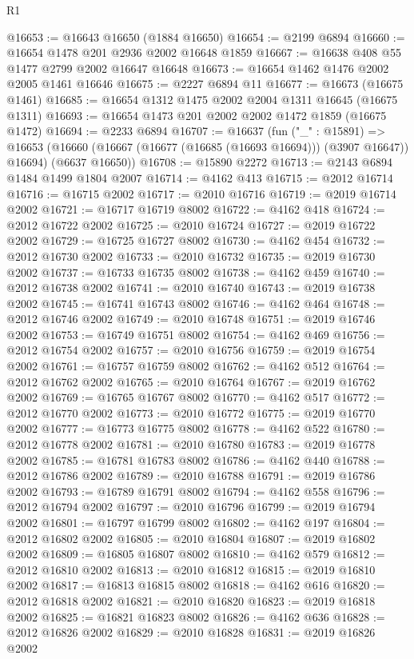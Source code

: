 \begin{lexlean}{R1}
\begin{coremodule}
@16653 := @16643 @16650 (@1884 @16650)
@16654 := @2199 @6894
@16660 := @16654 @1478 @201 @2936 @2002 @16648 @1859
@16667 := @16638 @408 @55 @1477 @2799 @2002 @16647 @16648
@16673 := @16654 @1462 @1476 @2002 @2005 @1461 @16646
@16675 := @2227 @6894 @11
@16677 := @16673 (@16675 @1461)
@16685 := @16654 @1312 @1475 @2002 @2004 @1311 @16645 (@16675 @1311)
@16693 := @16654 @1473 @201 @2002 @2002 @1472 @1859 (@16675 @1472)
@16694 := @2233 @6894
@16707 := @16637
    (fun ("_" : @15891) =>
    @16653 (@16660 (@16667 (@16677 (@16685 (@16693 @16694))) (@3907 @16647)) @16694) (@6637 @16650))
@16708 := @15890 @2272
@16713 := @2143 @6894 @1484 @1499 @1804 @2007
@16714 := @4162 @413
@16715 := @2012 @16714
@16716 := @16715 @2002
@16717 := @2010 @16716
@16719 := @2019 @16714 @2002
@16721 := @16717 @16719 @8002
@16722 := @4162 @418
@16724 := @2012 @16722 @2002
@16725 := @2010 @16724
@16727 := @2019 @16722 @2002
@16729 := @16725 @16727 @8002
@16730 := @4162 @454
@16732 := @2012 @16730 @2002
@16733 := @2010 @16732
@16735 := @2019 @16730 @2002
@16737 := @16733 @16735 @8002
@16738 := @4162 @459
@16740 := @2012 @16738 @2002
@16741 := @2010 @16740
@16743 := @2019 @16738 @2002
@16745 := @16741 @16743 @8002
@16746 := @4162 @464
@16748 := @2012 @16746 @2002
@16749 := @2010 @16748
@16751 := @2019 @16746 @2002
@16753 := @16749 @16751 @8002
@16754 := @4162 @469
@16756 := @2012 @16754 @2002
@16757 := @2010 @16756
@16759 := @2019 @16754 @2002
@16761 := @16757 @16759 @8002
@16762 := @4162 @512
@16764 := @2012 @16762 @2002
@16765 := @2010 @16764
@16767 := @2019 @16762 @2002
@16769 := @16765 @16767 @8002
@16770 := @4162 @517
@16772 := @2012 @16770 @2002
@16773 := @2010 @16772
@16775 := @2019 @16770 @2002
@16777 := @16773 @16775 @8002
@16778 := @4162 @522
@16780 := @2012 @16778 @2002
@16781 := @2010 @16780
@16783 := @2019 @16778 @2002
@16785 := @16781 @16783 @8002
@16786 := @4162 @440
@16788 := @2012 @16786 @2002
@16789 := @2010 @16788
@16791 := @2019 @16786 @2002
@16793 := @16789 @16791 @8002
@16794 := @4162 @558
@16796 := @2012 @16794 @2002
@16797 := @2010 @16796
@16799 := @2019 @16794 @2002
@16801 := @16797 @16799 @8002
@16802 := @4162 @197
@16804 := @2012 @16802 @2002
@16805 := @2010 @16804
@16807 := @2019 @16802 @2002
@16809 := @16805 @16807 @8002
@16810 := @4162 @579
@16812 := @2012 @16810 @2002
@16813 := @2010 @16812
@16815 := @2019 @16810 @2002
@16817 := @16813 @16815 @8002
@16818 := @4162 @616
@16820 := @2012 @16818 @2002
@16821 := @2010 @16820
@16823 := @2019 @16818 @2002
@16825 := @16821 @16823 @8002
@16826 := @4162 @636
@16828 := @2012 @16826 @2002
@16829 := @2010 @16828
@16831 := @2019 @16826 @2002

\end{coremodule}
\end{lexlean}

